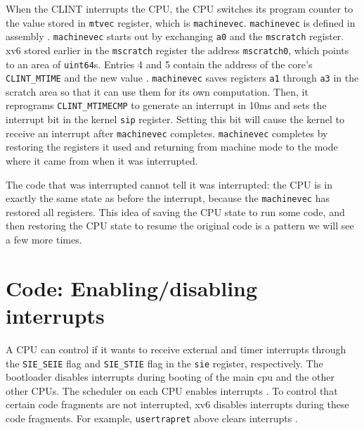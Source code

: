 When the CLINT interrupts the CPU, the CPU switches its
program counter to the value stored in \lstinline{mtvec} register,
which is \lstinline{machinevec}.  \lstinline{machinevec} is defined in
assembly .
\lstinline{machinevec} starts out by exchanging \lstinline{a0} and the
\lstinline{mscratch} register.  xv6 stored earlier in the
\lstinline{mscratch} register  the
address \lstinline{mscratch0}, which points to an area of
\lstinline{uint64}s.  Entries 4 and 5 contain the address of the
core's \lstinline{CLINT_MTIME} and the new value
.
\lstinline{machinevec} saves registers \lstinline{a1} through
\lstinline{a3} in the scratch area so that it can use them for its own
computation.  Then, it reprograms \lstinline{CLINT_MTIMECMP} to
generate an interrupt in 10ms and sets the interrupt bit in the kernel
\lstinline{sip} register.  Setting this bit will cause the kernel to
receive an interrupt after \lstinline{machinevec} completes.
\lstinline{machinevec} completes by restoring the registers it used
and returning from machine mode  to
the mode where it came from when it was interrupted.

The code that was interrupted cannot tell it was interrupted: the
CPU is in exactly the same state as before the interrupt,
because the \lstinline{machinevec} has restored all registers.  This
idea of saving the CPU state to run some code, and then
restoring the CPU state to resume the original code is a pattern
we will see a few more times.
 
\section{Code: Enabling/disabling interrupts}

A CPU can control if it wants to receive external and timer
interrupts through the \lstinline{SIE_SEIE}
 flag and \lstinline{SIE_STIE}
 flag in the \texttt{sie}
register, respectively.  The bootloader disables interrupts during
booting of the main cpu and the other other CPUs.  The scheduler on
each CPU enables interrupts .  To
control that certain code fragments are not interrupted, xv6 disables
interrupts during these code fragments.  For example,
\lstinline{usertrapret} above clears interrupts
.

